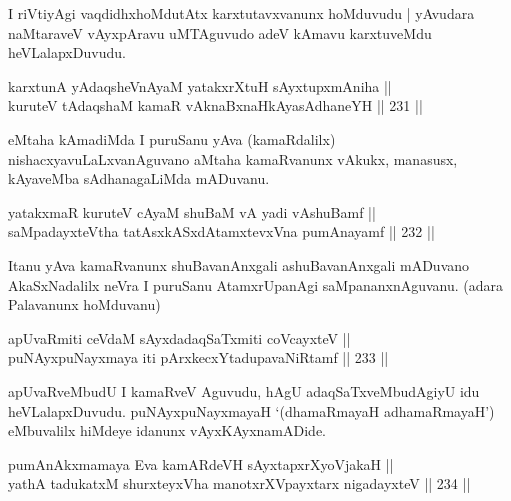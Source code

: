 \begin{artha}
I riVtiyAgi vaqdidhxhoMdutAtx karxtutavxvanunx hoMduvudu | yAvudara
naMtaraveV vAyxpAravu uMTAguvudo adeV kAmavu karxtuveMdu heVLalapxDuvudu.
\end{artha}


\begin{shl}
karxtunA yAdaqsheVnAyaM yatakxrXtuH sAyxtupxmAniha || \\
kuruteV tAdaqshaM kamaR vAknaBxnaHkAyasAdhaneYH \hfill || 231 || 
\end{shl}

\begin{artha}
eMtaha kAmadiMda I puruSanu yAva (kamaRdalilx)
nishacxyavuLaLxvanAguvano aMtaha kamaRvanunx vAkukx, manasusx,
kAyaveMba sAdhanagaLiMda mADuvanu.
\end{artha}

\begin{shl}
yatakxmaR kuruteV cAyaM shuBaM vA yadi vA\s shuBamf || \\
saMpadayxteV\s tha tatAsxkASxdAtamxtevxVna pumAnayamf \hfill || 232 ||  
\end{shl}

\begin{artha}
Itanu yAva kamaRvanunx shuBavanAnxgali ashuBavanAnxgali mADuvano
AkaSxNadalilx neVra I puruSanu AtamxrUpanAgi saMpananxnAguvanu.
(adara Palavanunx hoMduvanu) 
\end{artha}


\begin{shl}
apUvaRmiti ceVdaM sAyxdadaqSaTxmiti coVcayxteV || \\
puNAyxpuNayxmaya iti pArxkecxYtadupavaNiRtamf \hfill || 233 ||  
\end{shl}

\begin{artha}
apUvaRveMbudU I kamaRveV Aguvudu, hAgU adaqSaTxveMbudAgiyU idu
heVLalapxDuvudu. puNAyxpuNayxmayaH `(dhamaRmayaH adhamaRmayaH')
eMbuvalilx hiMdeye idanunx vAyxKAyxnamADide.
\end{artha}


\begin{shl}
pumAnAkxmamaya Eva kamARdeVH sAyxtapxrXyoVjakaH || \\
yathA tadukatxM shurxteyxVha manotxrXV\s payxtarx nigadayxteV \hfill || 234 ||  
\end{shl}

